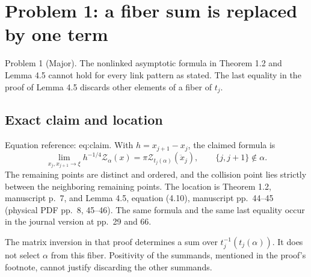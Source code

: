 \documentclass[10pt]{article}
\begin{document}
\section*{Problem 1: a fiber sum is replaced by one term}
Problem 1 (Major).  The nonlinked asymptotic formula in Theorem 1.2 and Lemma 4.5 cannot hold for every link pattern as stated. The last equality in the proof of Lemma 4.5 discards other elements of a fiber of \(t_j\).\par
\subsection*{Exact claim and location}
Equation reference: eq:claim. With \(h=x_{j+1}-x_j\), the claimed formula is \[
 \lim_{x_j,x_{j+1}\to\xi} h^{-1/4}\mathcal Z_\alpha(x)
   =\pi\mathcal Z_{t_j(\alpha)}(\ddot x_j),
 \qquad \{j,j+1\}\notin\alpha .\] The remaining points are distinct and ordered, and the collision point lies strictly between the neighboring remaining points. The location is Theorem 1.2, manuscript p. 7, and Lemma 4.5, equation (4.10), manuscript pp. 44–45 (physical PDF pp. 8, 45–46). The same formula and the same last equality occur in the journal version at pp. 29 and 66.\par
The matrix inversion in that proof determines a sum over \(t_j^{-1}(t_j(\alpha))\). It does not select \(\alpha\) from this fiber. Positivity of the summands, mentioned in the proof’s footnote, cannot justify discarding the other summands.\par
\end{document}
